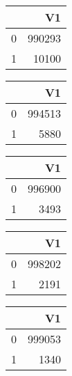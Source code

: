 \bigskip\bigskip
\centering
\begin{tabular}{rr}
  \hline
 & V1 \\ 
  \hline
0 & 990293 \\ 
  1 & 10100 \\ 
   \hline
\end{tabular}

\bigskip\bigskip
\centering
\begin{tabular}{rr}
  \hline
 & V1 \\ 
  \hline
0 & 994513 \\ 
  1 & 5880 \\ 
   \hline
\end{tabular}

\bigskip\bigskip
\centering
\begin{tabular}{rr}
  \hline
 & V1 \\ 
  \hline
0 & 996900 \\ 
  1 & 3493 \\ 
   \hline
\end{tabular}

\bigskip\bigskip
\centering
\begin{tabular}{rr}
  \hline
 & V1 \\ 
  \hline
0 & 998202 \\ 
  1 & 2191 \\ 
   \hline
\end{tabular}

\bigskip\bigskip
\centering
\begin{tabular}{rr}
  \hline
 & V1 \\ 
  \hline
0 & 999053 \\ 
  1 & 1340 \\ 
   \hline
\end{tabular}

